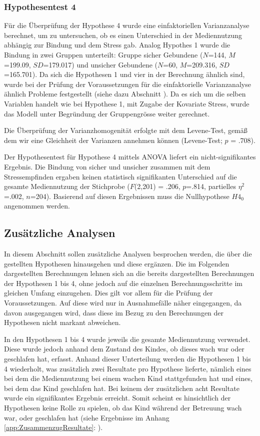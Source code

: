 \subsubsection{Hypothesentest 4}
Für die Überprüfung der Hypothese 4 wurde eine einfaktoriellen Varianzanalyse berechnet, um zu untersuchen, ob es einen Unterschied in der Mediennutzung abhängig zur Bindung und dem Stress gab. Analog Hypothes 1 wurde die Bindung in zwei Gruppen unterteilt: Gruppe sicher Gebundene ($N$=144, $M$=199.09, $SD$=179.017) und unsicher Gebundene ($N$=60, $M$=209.316, $SD$=165.701). Da sich die Hypothesen 1 und vier in der Berechnung ähnlich sind, wurde bei der Prüfung der Voraussetzungen für die einfaktorielle Varianzanalyse ähnlich Probleme festgestellt (siehe dazu Abschnitt ). Da es sich um die selben Variablen handelt wie bei Hypothese 1, mit Zugabe der Kovariate Stress, wurde das Modell unter Begründung der Gruppengrösse weiter gerechnet. 

Die Überprüfung der Varianzhomogenität erfolgte mit dem Levene-Test, gemäß dem wir eine Gleichheit der Varianzen annehmen können (Levene-Test; $p$ = .708). 

Der Hypothesentest für Hypothese 4 mittels ANOVA liefert ein nicht-signifikantes Ergebnis. Die Bindung von sicher und unsicher zusammen mit dem Stressempfinden ergaben keinen statistisch signifikanten Unterschied auf die gesamte Mediennutzung der Stichprobe ($F$(2,201) = .206, $p$=.814, partielles $\eta^2$=.002, $n$=204). Basierend auf diesen Ergebnissen muss die Nullhypothese $H4_{0}$ angenommen werden. 

\subsection{Zusätzliche Analysen} \label{sec:ZusätzlicheAnalysen}
In diesem Abschnitt sollen zusätzliche Analysen besprochen werden, die über die gestellten Hypothesen hinausgehen und diese ergänzen. Die im Folgenden dargestellten Berechnungen lehnen sich an die bereits dargestellten Berechnungen der Hypothesen 1 bis 4, ohne jedoch auf die einzelnen Berechnungsschritte im gleichen Umfang einzugehen. Dies gilt vor allem für die Prüfung der Voraussetzungen. Auf diese wird nur in Ausnahmefälle näher eingegangen, da davon ausgegangen wird, dass diese im Bezug zu den Berechnungen der Hypothesen nicht markant abweichen.

In den Hypothesen 1 bis 4 wurde jeweils die gesamte Mediennutzung verwendet. Diese wurde jedoch anhand dem Zustand des Kindes, ob dieses wach war oder geschlafen hat, erfasst. Anhand dieser Unterteilung werden die Hypothesen 1 bis 4 wiederholt, was zusätzlich zwei Resultate pro Hypothese lieferte, nämlich eines bei dem die Mediennutzung bei einem wachen Kind stattgefunden hat und eines, bei dem das Kind geschlafen hat. Bei keinem der zusätzlichen acht Resultate wurde ein signifikantes Ergebnis erreicht. Somit scheint es hinsichtlich der Hypothesen keine Rolle zu spielen, ob das Kind während der Betreuung wach war, oder geschlafen hat (siehe Ergebnisse im Anhang \ref{app:ZusammenzugResultate}: \textit{}). 

